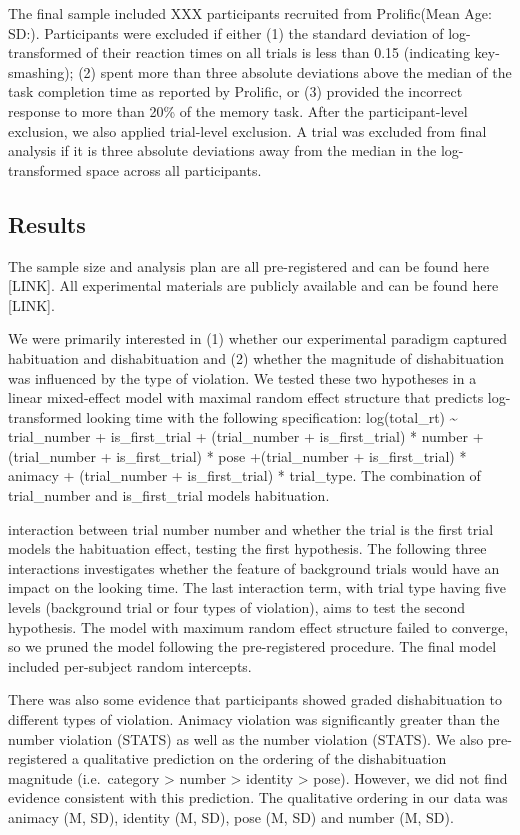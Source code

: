 \documentclass[10pt, letterpaper]{article}
\begin{document}
The final sample included XXX participants recruited from Prolific(Mean
Age: SD:). Participants were excluded if either (1) the standard
deviation of log-transformed of their reaction times on all trials is
less than 0.15 (indicating key-smashing); (2) spent more than three
absolute deviations above the median of the task completion time as
reported by Prolific, or (3) provided the incorrect response to more
than 20\% of the memory task. After the participant-level exclusion, we
also applied trial-level exclusion. A trial was excluded from final
analysis if it is three absolute deviations away from the median in the
log-transformed space across all participants.

\hypertarget{results}{%
\subsection{Results}\label{results}}

The sample size and analysis plan are all pre-registered and can be
found here {[}LINK{]}. All experimental materials are publicly available
and can be found here {[}LINK{]}.

We were primarily interested in (1) whether our experimental paradigm
captured habituation and dishabituation and (2) whether the magnitude of
dishabituation was influenced by the type of violation. We tested these
two hypotheses in a linear mixed-effect model with maximal random effect
structure that predicts log-transformed looking time with the following
specification: log(total\_rt) \textasciitilde{} trial\_number +
is\_first\_trial + (trial\_number + is\_first\_trial) * number +
(trial\_number + is\_first\_trial) * pose +(trial\_number +
is\_first\_trial) * animacy + (trial\_number + is\_first\_trial) *
trial\_type. The combination of trial\_number and is\_first\_trial
models habituation.

interaction between trial number number and whether the trial is the
first trial models the habituation effect, testing the first hypothesis.
The following three interactions investigates whether the feature of
background trials would have an impact on the looking time. The last
interaction term, with trial type having five levels (background trial
or four types of violation), aims to test the second hypothesis. The
model with maximum random effect structure failed to converge, so we
pruned the model following the pre-registered procedure. The final model
included per-subject random intercepts.

There was also some evidence that participants showed graded
dishabituation to different types of violation. Animacy violation was
significantly greater than the number violation (STATS) as well as the
number violation (STATS). We also pre-registered a qualitative
prediction on the ordering of the dishabituation magnitude
(i.e.~category \textgreater{} number \textgreater{} identity
\textgreater{} pose). However, we did not find evidence consistent with
this prediction. The qualitative ordering in our data was animacy (M,
SD), identity (M, SD), pose (M, SD) and number (M, SD).
\end{document}
